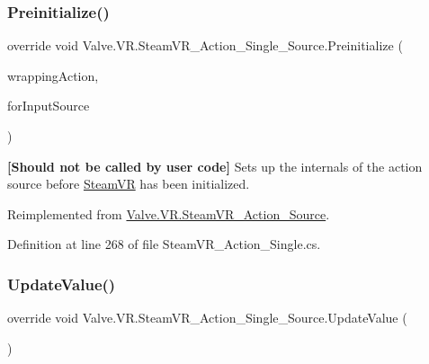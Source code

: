 \mbox{\label{class_valve_1_1_v_r_1_1_steam_v_r___action___single___source_a97639a0235a7e499841ac96ca2642f83}} 
\subsubsection{\texorpdfstring{Preinitialize()}{Preinitialize()}}
{\footnotesize\ttfamily override void Valve.\+V\+R.\+Steam\+V\+R\+\_\+\+Action\+\_\+\+Single\+\_\+\+Source.\+Preinitialize (\begin{DoxyParamCaption}\item[{\mbox{\hyperlink{class_valve_1_1_v_r_1_1_steam_v_r___action}{Steam\+V\+R\+\_\+\+Action}}}]{wrapping\+Action,  }\item[{\mbox{\hyperlink{namespace_valve_1_1_v_r_a82e5bf501cc3aa155444ee3f0662853f}{Steam\+V\+R\+\_\+\+Input\+\_\+\+Sources}}}]{for\+Input\+Source }\end{DoxyParamCaption})\hspace{0.3cm}{\ttfamily [virtual]}}



{\bfseries{\mbox{[}Should not be called by user code\mbox{]}}} Sets up the internals of the action source before \mbox{\hyperlink{class_valve_1_1_v_r_1_1_steam_v_r}{Steam\+VR}} has been initialized. 



Reimplemented from \mbox{\hyperlink{class_valve_1_1_v_r_1_1_steam_v_r___action___source_aa2bec7f32b37595de01f1456a3fa5bfe}{Valve.\+V\+R.\+Steam\+V\+R\+\_\+\+Action\+\_\+\+Source}}.



Definition at line 268 of file Steam\+V\+R\+\_\+\+Action\+\_\+\+Single.\+cs.

\mbox{\label{class_valve_1_1_v_r_1_1_steam_v_r___action___single___source_a9b567d59d3f01262b3da646223016c99}} 
\subsubsection{\texorpdfstring{UpdateValue()}{UpdateValue()}}
{\footnotesize\ttfamily override void Valve.\+V\+R.\+Steam\+V\+R\+\_\+\+Action\+\_\+\+Single\+\_\+\+Source.\+Update\+Value (\begin{DoxyParamCaption}{ }\end{DoxyParamCaption})\hspace{0.3cm}{\ttfamily [virtual]}}



